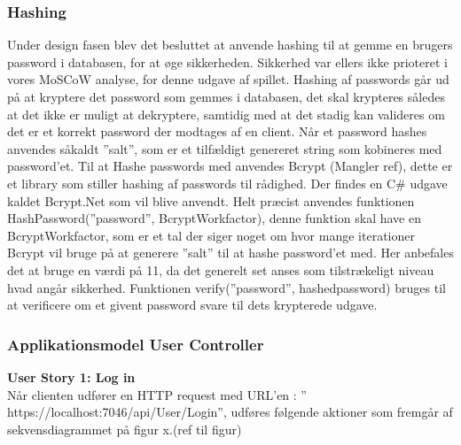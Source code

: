 \subsubsection{Hashing}
Under design fasen blev det besluttet at anvende hashing til at gemme en brugers password i databasen, for at øge sikkerheden. Sikkerhed var ellers ikke prioteret i vores MoSCoW analyse, for denne udgave af spillet.
Hashing af passwords går ud på at kryptere det password som gemmes i databasen, det skal krypteres således at det ikke er muligt at dekryptere, samtidig med at det stadig kan valideres om det er et korrekt password der modtages af en client. Når et password hashes anvendes såkaldt ”salt”, som er et tilfældigt genereret string som kobineres med password’et.
Til at Hashe passwords med anvendes Bcrypt (Mangler ref), dette er et library som stiller hashing af passwords til rådighed. Der findes en C\# udgave kaldet Bcrypt.Net  som vil blive anvendt. Helt præcist anvendes funktionen HashPassword(”password”, BcryptWorkfactor), denne funktion skal have en BcryptWorkfactor, som er et tal der siger noget om hvor mange iterationer Bcrypt vil bruge på at generere ”salt” til at hashe password’et med. Her anbefales det at bruge en værdi på 11, da det generelt set anses som tilstrækeligt niveau hvad angår sikkerhed.
Funktionen verify(”password”, hashedpassword) bruges til at verificere om et givent password svare til dets krypterede udgave.\\

\subsubsection{Applikationsmodel User Controller}
\textbf{User Story 1: Log in}\\
Når clienten udfører en HTTP request med URL’en : ” https://localhost:7046/api/User/Login”, udføres følgende aktioner som fremgår af sekvensdiagrammet på figur x.(ref til figur)\\ 

